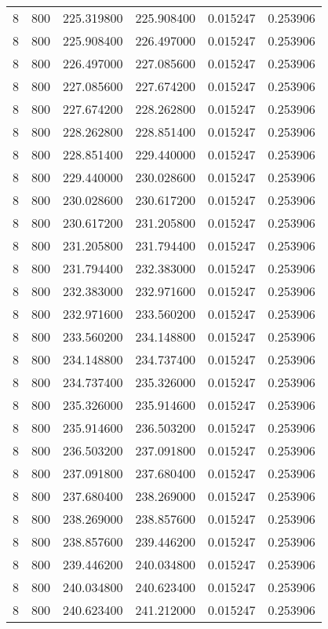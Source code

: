 \begin{longtable}{rrrrrr}
8 & 800 & 225.319800 & 225.908400 & 0.015247 & 0.253906 \\
8 & 800 & 225.908400 & 226.497000 & 0.015247 & 0.253906 \\
8 & 800 & 226.497000 & 227.085600 & 0.015247 & 0.253906 \\
8 & 800 & 227.085600 & 227.674200 & 0.015247 & 0.253906 \\
8 & 800 & 227.674200 & 228.262800 & 0.015247 & 0.253906 \\
8 & 800 & 228.262800 & 228.851400 & 0.015247 & 0.253906 \\
8 & 800 & 228.851400 & 229.440000 & 0.015247 & 0.253906 \\
8 & 800 & 229.440000 & 230.028600 & 0.015247 & 0.253906 \\
8 & 800 & 230.028600 & 230.617200 & 0.015247 & 0.253906 \\
8 & 800 & 230.617200 & 231.205800 & 0.015247 & 0.253906 \\
8 & 800 & 231.205800 & 231.794400 & 0.015247 & 0.253906 \\
8 & 800 & 231.794400 & 232.383000 & 0.015247 & 0.253906 \\
8 & 800 & 232.383000 & 232.971600 & 0.015247 & 0.253906 \\
8 & 800 & 232.971600 & 233.560200 & 0.015247 & 0.253906 \\
8 & 800 & 233.560200 & 234.148800 & 0.015247 & 0.253906 \\
8 & 800 & 234.148800 & 234.737400 & 0.015247 & 0.253906 \\
8 & 800 & 234.737400 & 235.326000 & 0.015247 & 0.253906 \\
8 & 800 & 235.326000 & 235.914600 & 0.015247 & 0.253906 \\
8 & 800 & 235.914600 & 236.503200 & 0.015247 & 0.253906 \\
8 & 800 & 236.503200 & 237.091800 & 0.015247 & 0.253906 \\
8 & 800 & 237.091800 & 237.680400 & 0.015247 & 0.253906 \\
8 & 800 & 237.680400 & 238.269000 & 0.015247 & 0.253906 \\
8 & 800 & 238.269000 & 238.857600 & 0.015247 & 0.253906 \\
8 & 800 & 238.857600 & 239.446200 & 0.015247 & 0.253906 \\
8 & 800 & 239.446200 & 240.034800 & 0.015247 & 0.253906 \\
8 & 800 & 240.034800 & 240.623400 & 0.015247 & 0.253906 \\
8 & 800 & 240.623400 & 241.212000 & 0.015247 & 0.253906 \\

\end{longtable}
